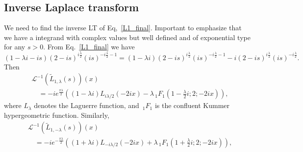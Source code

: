 \documentclass[%
 aip,
 jmp,%
 amsmath,amssymb,
 reprint,%
]{revtex4-2}
\begin{document}
\subsection{Inverse Laplace transform}

We need to find the inverse LT of Eq,~\eqref{L1_final}. Important to emphasize that we have a integrand with complex values but well defined and of exponential type for any $s > 0$.
From Eq.~\eqref{L1_final} we have
\begin{equation}\label{eq:L1_final-2}
    (1-\lambda i-i s) (2-i s)^{i\frac{\lambda}{2} } (i s)^{-i\frac{\lambda}{2}-1} = (1-\lambda i) (2-i s)^{i\frac{\lambda}{2} } (i s)^{-i\frac{\lambda}{2}-1} -i  (2-i s)^{i\frac{\lambda}{2} } (i s)^{-i\frac{\lambda}{2}}.
\end{equation}
Then
\[
\boxed{\begin{aligned}
& \mathcal L^{-1}\left(\widetilde L_{1,\lambda} (s) \right)(x)\\
& \quad =  -i e^{\frac{\pi  \lambda}{2}}  \left( (1-\lambda i)  L_{i \lambda/2}(-2 i x)  - \lambda \, _1F_1\left(1- \frac{\lambda}2 i ;2;-2 i x \right) \right),
\end{aligned}}
\]
where $L_\lambda$ denotes the Laguerre function, and $\,_1F_1$ is the confluent Kummer hypergeometric function. Similarly, 
\[
\boxed{\begin{aligned}
& \mathcal L^{-1}\left(\widetilde L_{1,-\lambda} (s) \right)(x)\\
& \quad = -i  e^{-\frac{\pi  \lambda}{2}}   \left( (1+ \lambda i)L_{-i \lambda/2}(-2 i x) + \lambda \, _1F_1\left(1+  \frac{\lambda}2i ;2;-2 i x \right) \right),
\end{aligned}}
\]
\end{document}
